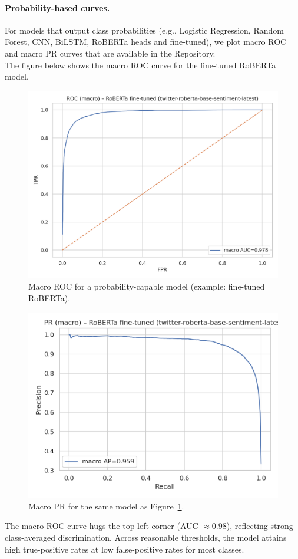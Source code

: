 \documentclass[10pt]{article}
\begin{document}
\paragraph{Probability-based curves.}
For models that output class probabilities (e.g., Logistic Regression, Random Forest, CNN, BiLSTM, RoBERTa heads and fine-tuned), we plot macro ROC and macro PR curves that are available in the Repository.\\
The figure below shows the macro ROC curve for the fine-tuned RoBERTa model.
\begin{figure}[H]
  \centering
  \includegraphics[width=.55\linewidth]{../SCRITPS/artifacts/figures/curves_roberta_fine-tuned_(twitter-roberta-base-sentiment-latest)_roc_macro.png}
  \caption{Macro ROC for a probability-capable model (example: fine-tuned RoBERTa).}
  \label{fig:roc-example}
\end{figure}

\begin{figure}[H]
  \centering
  \includegraphics[width=.55\linewidth]{../SCRITPS/artifacts/figures/curves_roberta_fine-tuned_(twitter-roberta-base-sentiment-latest)_pr_macro.png}
  \caption{Macro PR for the same model as Figure~\ref{fig:roc-example}.}
  \label{fig:pr-example}
\end{figure}
The macro ROC curve hugs the top-left corner (AUC $\approx 0.98$), reflecting strong class-averaged discrimination. Across reasonable thresholds, the model attains high true-positive rates at low false-positive rates for most classes.
\end{document}
